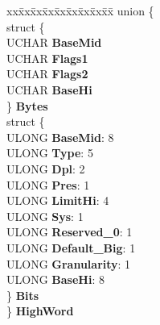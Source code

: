 \begin{DoxyCompactItemize}
\begin{tabbing}
\end{tabbing}\item 
\mbox{\label{struct___l_d_t___e_n_t_r_y_a315a70ea76d63d4f64b38f8cdf27727e}} 
\begin{tabbing}
xx\=xx\=xx\=xx\=xx\=xx\=xx\=xx\=xx\=\kill
union \{\\
\>struct \{\\
\>\>UCHAR {\bfseries BaseMid}\\
\>\>UCHAR {\bfseries Flags1}\\
\>\>UCHAR {\bfseries Flags2}\\
\>\>UCHAR {\bfseries BaseHi}\\
\>\} {\bfseries Bytes}\\
\>struct \{\\
\>\>ULONG {\bfseries BaseMid}: 8\\
\>\>ULONG {\bfseries Type}: 5\\
\>\>ULONG {\bfseries Dpl}: 2\\
\>\>ULONG {\bfseries Pres}: 1\\
\>\>ULONG {\bfseries LimitHi}: 4\\
\>\>ULONG {\bfseries Sys}: 1\\
\>\>ULONG {\bfseries Reserved\_0}: 1\\
\>\>ULONG {\bfseries Default\_Big}: 1\\
\>\>ULONG {\bfseries Granularity}: 1\\
\>\>ULONG {\bfseries BaseHi}: 8\\
\>\} {\bfseries Bits}\\
\} {\bfseries HighWord}\\


\end{tabbing}
\end{DoxyCompactItemize}
